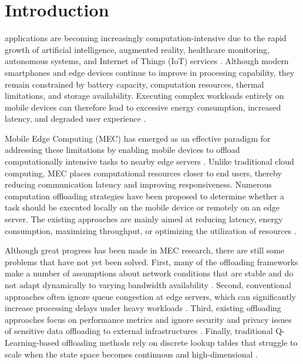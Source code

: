 \documentclass{ieeeaccess}
\begin{document}
\titlepgskip=-15pt

\maketitle

\section{Introduction}
\label{sec:introduction}
 applications are becoming increasingly computation-intensive due to the rapid growth of artificial intelligence, augmented reality, healthcare monitoring, autonomous systems, and Internet of Things (IoT) services \cite{akherfi2018,mao2017}. Although modern smartphones and edge devices continue to improve in processing capability, they remain constrained by battery capacity, computation resources, thermal limitations, and storage availability. Executing complex workloads entirely on mobile devices can therefore lead to excessive energy consumption, increased latency, and degraded user experience \cite{cuervo2010,chun2011}.

Mobile Edge Computing (MEC) has emerged as an effective paradigm for addressing these limitations by enabling mobile devices to offload computationally intensive tasks to nearby edge servers \cite{lin2019,mao2017}. Unlike traditional cloud computing, MEC places computational resources closer to end users, thereby reducing communication latency and improving responsiveness. Numerous computation offloading strategies have been proposed to determine whether a task should be executed locally on the mobile device or remotely on an edge server. The existing approaches are mainly aimed at reducing latency, energy consumption, maximizing throughput, or optimizing the utilization of resources \cite{akherfi2018,zhang2018,wang2018}.

Although great progress has been made in MEC research, there are still some problems that have not yet been solved. First, many of the offloading frameworks make a number of assumptions about network conditions that are stable and do not adapt dynamically to varying bandwidth availability \cite{cuervo2010,chun2011}. Second, conventional approaches often ignore queue congestion at edge servers, which can significantly increase processing delays under heavy workloads \cite{barbarossa2013,chen2016}. Third, existing offloading approaches focus on performance metrics and ignore security and privacy issues of sensitive data offloading to external infrastructures \cite{zhu2013,gan2023}. Finally, traditional Q-Learning-based offloading methods rely on discrete lookup tables that struggle to scale when the state space becomes continuous and high-dimensional \cite{kiran2020,tang2022,huang2019}.
\end{document}
